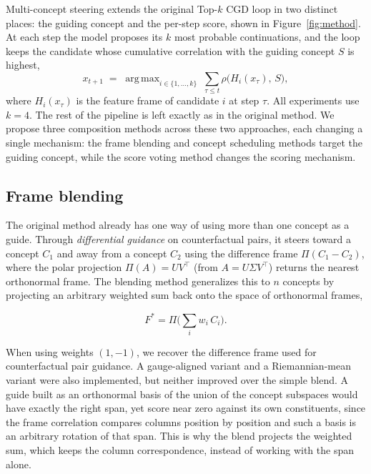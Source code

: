 \documentclass[a4paper,10pt,twocolumn]{article}
\DeclareMathOperator*{\argmax}{arg\,max}
\begin{document}
Multi-concept steering extends the original Top-$k$ CGD loop in two distinct places: the guiding concept and the per-step score, shown in Figure~\ref{fig:method}. At each step the model proposes its $k$ most probable continuations, and the loop keeps the candidate whose cumulative correlation with the guiding concept $S$ is highest,
\begin{equation}
x_{t+1} \;=\; \argmax_{i \in \{1,\dots,k\}} \; \sum_{\tau \le t} \rho\bigl(H_i(x_\tau),\, S\bigr),
\end{equation}
where $H_i(x_\tau)$ is the feature frame of candidate $i$ at step $\tau$. All experiments use $k = 4$. The rest of the pipeline is left exactly as in the original method. We propose three composition methods across these two approaches, each changing a single mechanism: the frame blending and concept scheduling methods target the guiding concept, while the score voting method changes the scoring mechanism.

\subsection{Frame blending}
The original method already has one way of using more than one concept as a guide. Through \emph{differential guidance} on counterfactual pairs, it steers toward a concept $C_1$ and away from a concept $C_2$ using the difference frame $\Pi(C_1 - C_2)$, where the polar projection $\Pi(A) = U V^{\top}$ (from $A = U\Sigma V^{\top}$) returns the nearest orthonormal frame. The blending method generalizes this to $n$ concepts by projecting an arbitrary weighted sum back onto the space of orthonormal frames,

\begin{equation}
F^{*} = \Pi\!\Big(\textstyle\sum_i w_i\, C_i\Big).
\end{equation}

When using weights $(1, -1)$, we recover the difference frame used for counterfactual pair guidance. A gauge-aligned variant and a Riemannian-mean variant were also implemented, but neither improved over the simple blend. A guide built as an orthonormal basis of the union of the concept subspaces would have exactly the right span, yet score near zero against its own constituents, since the frame correlation compares columns position by position and such a basis is an arbitrary rotation of that span. This is why the blend projects the weighted sum, which keeps the column correspondence, instead of working with the span alone.
\end{document}
